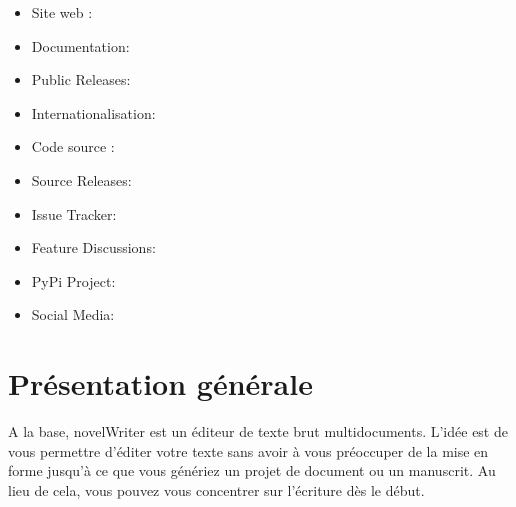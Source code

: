 \documentclass[a4paper,11pt,french]{sphinxmanual}
\begin{document}
\sphinxAtStartPar
{}
\begin{itemize}
\item {} 
\sphinxAtStartPar
Site web : 

\item {} 
\sphinxAtStartPar
Documentation: 

\item {} 
\sphinxAtStartPar
Public Releases: 

\item {} 
\sphinxAtStartPar
Internationalisation: 

\item {} 
\sphinxAtStartPar
Code source : 

\item {} 
\sphinxAtStartPar
Source Releases: 

\item {} 
\sphinxAtStartPar
Issue Tracker: 

\item {} 
\sphinxAtStartPar
Feature Discussions: 

\item {} 
\sphinxAtStartPar
PyPi Project: 

\item {} 
\sphinxAtStartPar
Social Media: 

\end{itemize}

\sphinxstepscope


\chapter{Présentation générale}
\label{\detokenize{int_introduction:overview}}\label{\detokenize{int_introduction:a-intro}}\label{\detokenize{int_introduction::doc}}
\sphinxAtStartPar
A la base, novelWriter est un éditeur de texte brut multi\sphinxhyphen{}documents. L’idée est de vous permettre d’éditer votre texte sans avoir à vous préoccuper de la mise en forme jusqu’à ce que vous génériez un projet de document ou un manuscrit. Au lieu de cela, vous pouvez vous concentrer sur l’écriture dès le début.
\end{document}
